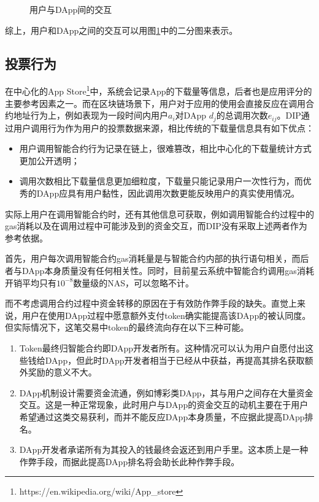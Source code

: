 \begin{figure}
	\centering
  
\caption{用户与DApp间的交互 \label{fig:interact}}
\end{figure}

综上，用户和DApp之间的交互可以用图\ref{fig:interact}中的二分图来表示。

\subsection{投票行为}
在中心化的App Store\footnote{https://en.wikipedia.org/wiki/App\_store}中，系统会记录App的下载量等信息，后者也是应用评分的主要参考因素之一。而在区块链场景下，用户对于应用的使用会直接反应在调用合约地址行为上，例如表现为一段时间内用户$a_i$对DApp $d_j$的总调用次数$e_{ij}$。DIP通过用户调用行为作为用户的投票数据来源，相比传统的下载量信息具有如下优点：
\begin{itemize}
	\item 用户调用智能合约行为记录在链上，很难篡改，相比中心化的下载量统计方式更加公开透明；
	\item 调用次数相比下载量信息更加细粒度，下载量只能记录用户一次性行为，而优秀的DApp应具有用户黏性，因此调用次数更能反映用户的真实使用情况。
\end{itemize}

实际上用户在调用智能合约时，还有其他信息可获取，例如调用智能合约过程中的gas消耗以及在调用过程中可能涉及到的资金交互，而DIP没有采取上述两者作为参考依据。

首先，用户每次调用智能合约gas消耗量是与智能合约内部的执行语句相关，而后者与DApp本身质量没有任何相关性。同时，目前星云系统中智能合约调用gas消耗开销平均只有$10^{-8}$数量级的NAS，可以忽略不计。


而不考虑调用合约过程中资金转移的原因在于有效防作弊手段的缺失。直觉上来说，用户在使用DApp过程中愿意额外支付token确实能提高该DApp的被认同度。但实际情况下，这笔交易中token的最终流向存在以下三种可能。
\begin{enumerate}
\item Token最终归智能合约即DApp开发者所有。这种情况可以认为用户自愿付出这些钱给DApp，但此时DApp开发者相当于已经从中获益，再提高其排名获取额外奖励的意义不大。

\item DApp机制设计需要资金流通，例如博彩类DApp，其与用户之间存在大量资金交互。这是一种正常现象，此时用户与DApp的资金交互的动机主要在于用户希望通过这类交易获利，而并不能反应DApp本身质量，不应据此提高DApp排名。

\item DApp开发者承诺所有为其投入的钱最终会返还到用户手里。这本质上是一种作弊手段，而据此提高DApp排名将会助长此种作弊手段。
\end{enumerate}

